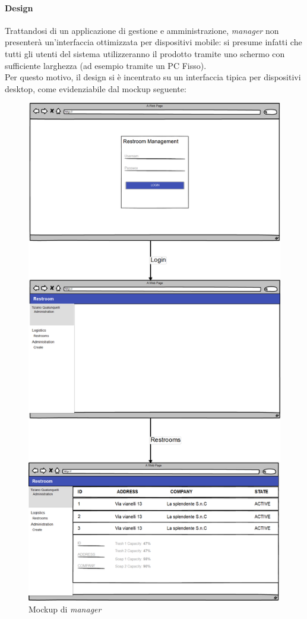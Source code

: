 \documentclass[12pt]{article}
\begin{document}
\paragraph{Design}
Trattandosi di un applicazione di gestione e amministrazione, \textit{manager} non presenterà un'interfaccia ottimizzata per dispositivi mobile: si presume infatti che tutti gli utenti del sistema utilizzeranno il prodotto tramite uno schermo con sufficiente larghezza (ad esempio tramite un PC Fisso).\\Per questo motivo, il design si è incentrato su un interfaccia tipica per dispositivi desktop, come evidenziabile dal mockup seguente: 
\begin{figure}[h!]
\centering
  \includegraphics[scale=0.20]{img/mockup-manager.png}
  \caption{Mockup di \textit{manager}}
\end{figure}\\
\end{document}
